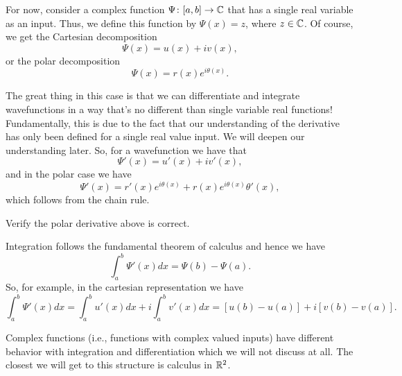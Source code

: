 For now, consider a complex function $\Psi\colon [a,b] \to \mathbb{C}$ that has a single real variable as an input.  Thus, we define this function by $\Psi(x)=z$, where $z\in \mathbb{C}$.  Of course, we get the Cartesian decomposition
\[
\Psi(x)=u(x)+iv(x),
\]
or the polar decomposition
\[
\Psi(x)=r(x)e^{i\theta(x)}.
\]

The great thing in this case is that we can differentiate and integrate wavefunctions in a way that's no different than single variable real functions!  Fundamentally, this is due to the fact that our understanding of the derivative has only been defined for a single real value input. We will deepen our understanding later.  So, for a wavefunction we have that
\[
\Psi'(x)=u'(x)+iv'(x),
\]
and in the polar case we have
\[
\Psi'(x)=r'(x)e^{i\theta(x)}+r(x)e^{i\theta(x)}\theta'(x),
\]
which follows from the chain rule.

\begin{exercise}
	Verify the polar derivative above is correct.
\end{exercise}

Integration follows the fundamental theorem of calculus and hence we have
\[
\int_a^b \Psi'(x)dx = \Psi(b)-\Psi(a).
\]
So, for example, in the cartesian representation we have
\[
\int_a^b \Psi'(x)dx = \int_a^b u'(x)dx+i\int_a^b v'(x)dx = [u(b)-u(a)]+i[v(b)-v(a)].
\]

\begin{remark}
	Complex functions (i.e., functions with complex valued inputs) have different behavior with integration and differentiation which we will not discuss at all.  The closest we will get to this structure is calculus in $\mathbb{R}^2$.
\end{remark}

